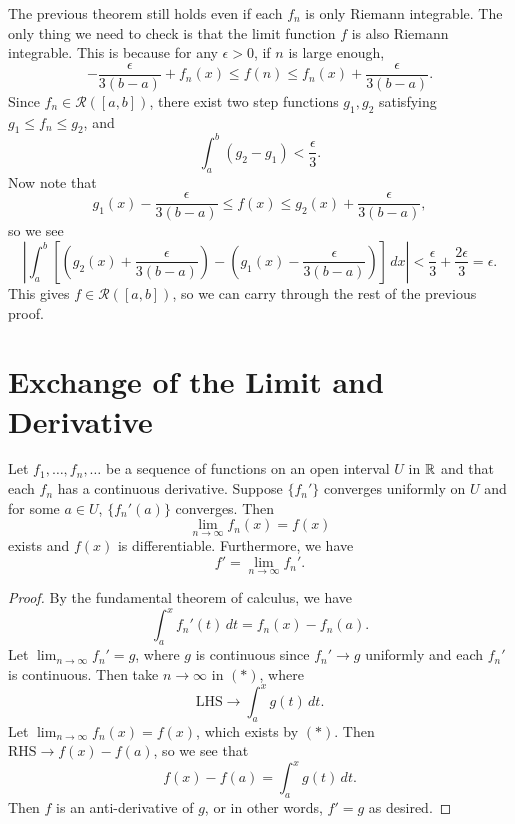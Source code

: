 \begin{remark}
  The previous theorem still holds even if each $f_n$
  is only Riemann integrable. The only thing we need to
  check is that the limit function $f$ is
  also Riemann integrable. This is because for
  any $\epsilon > 0$, if $n$ is large enough,
  \[
    -\frac{\epsilon}{3(b - a)} + f_n(x) \le f(n) \le f_n(x) + \frac{\epsilon}{3(b - a)}.
  \]
  Since $f_n \in \mathcal{R}([a, b])$, there exist
  two step functions $g_1, g_2$ satisfying
  $g_1 \le f_n \le g_2$, and
  \[
    \int_a^b (g_2 - g_1) < \frac{\epsilon}{3}.
  \]
  Now note that
  \[
    g_1(x) - \frac{\epsilon}{3(b - a)} \le f(x) \le g_2(x) + \frac{\epsilon}{3(b - a)},
  \]
  so we see
  \[
    \left|\int_a^b \left[\left(g_2(x) + \frac{\epsilon}{3(b - a)}\right) - \left(g_1(x) - \frac{\epsilon}{3(b - a)}\right)\right] \, dx\right|
    < \frac{\epsilon}{3} + \frac{2\epsilon}{3} = \epsilon.
  \]
  This gives $f \in \mathcal{R}([a, b])$, so we
  can carry through the rest of the previous proof.
\end{remark}

\section{Exchange of the Limit and Derivative}
\begin{theorem}
  \label{thm:exchange-limit-derivative}
  Let $f_1, \dots, f_n, \dots$ be a sequence of functions
  on an open interval $U$ in $\mathbb{R}$ and that each $f_n$ has
  a continuous derivative. Suppose $\{f_n'\}$ converges
  uniformly on $U$ and for some $a \in U$,
  $\{f_n'(a)\}$ converges. Then
  \[
    \lim_{n \to \infty} f_n(x) = f(x)
  \]
  exists and $f(x)$ is differentiable. Furthermore,
  we have
  \[
    f' = \lim_{n \to \infty} f_n'.
  \]
\end{theorem}

\begin{proof}
  By the fundamental theorem of calculus, we have
  \[
    \int_a^x f_n'(t)\, dt = f_n(x) - f_n(a). \tag{$*$}
  \]
  Let $\lim_{n \to \infty} f_n' = g$, where $g$ is
  continuous since $f_n' \to g$ uniformly and
  each $f_n'$ is continuous. Then take $n \to \infty$
  in $(*)$, where
  \[
    \text{LHS} \to \int_a^x g(t)\, dt.
  \]
  Let $\lim_{n \to \infty} f_n(x) = f(x)$, which
  exists by $(*)$. Then
  $\text{RHS} \to f(x) - f(a)$,
  so we see that
  \[
    f(x) - f(a) = \int_a^x g(t)\, dt.
  \]
  Then $f$ is an anti-derivative of $g$, or in other
  words, $f' = g$ as desired.
\end{proof}

